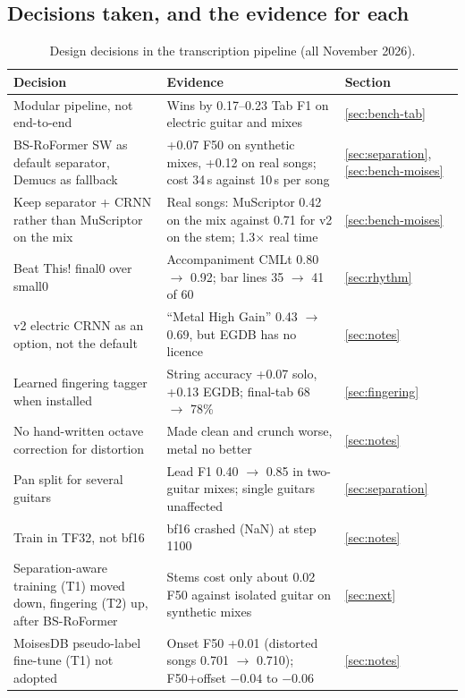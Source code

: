 \subsection{Decisions taken, and the evidence for each}

\begin{table}[h]
\centering
\caption{Design decisions in the transcription pipeline (all November 2026).}
\label{tab:decisions}
\small
\begin{tabularx}{\textwidth}{@{}>{\raggedright}p{4.3cm}X>{\raggedright\arraybackslash}p{1.5cm}@{}}
\toprule
Decision & Evidence & Section \\
\midrule
Modular pipeline, not end-to-end & Wins by 0.17--0.23 Tab F1 on electric guitar and mixes & \ref{sec:bench-tab} \\
BS-RoFormer SW as default separator, Demucs as fallback & +0.07 F50 on synthetic mixes, +0.12 on real songs; cost 34\,s against 10\,s per song & \ref{sec:separation}, \ref{sec:bench-moises} \\
Keep separator + CRNN rather than MuScriptor on the mix & Real songs: MuScriptor 0.42 on the mix against 0.71 for v2 on the stem; 1.3$\times$ real time & \ref{sec:bench-moises} \\
Beat This! final0 over small0 & Accompaniment CMLt 0.80 $\to$ 0.92; bar lines 35 $\to$ 41 of 60 & \ref{sec:rhythm} \\
v2 electric CRNN as an option, not the default & ``Metal High Gain'' 0.43 $\to$ 0.69, but EGDB has no licence & \ref{sec:notes} \\
Learned fingering tagger when installed & String accuracy +0.07 solo, +0.13 EGDB; final-tab 68 $\to$ 78\% & \ref{sec:fingering} \\
No hand-written octave correction for distortion & Made clean and crunch worse, metal no better & \ref{sec:notes} \\
Pan split for several guitars & Lead F1 0.40 $\to$ 0.85 in two-guitar mixes; single guitars unaffected & \ref{sec:separation} \\
Train in TF32, not bf16 & bf16 crashed (NaN) at step 1100 & \ref{sec:notes} \\
Separation-aware training (T1) moved down, fingering (T2) up, after BS-RoFormer & Stems cost only about 0.02 F50 against isolated guitar on synthetic mixes & \ref{sec:next} \\
MoisesDB pseudo-label fine-tune (T1) not adopted & Onset F50 +0.01 (distorted songs 0.701 $\to$ 0.710); F50+offset $-0.04$ to $-0.06$ & \ref{sec:notes} \\
\bottomrule
\end{tabularx}
\end{table}

